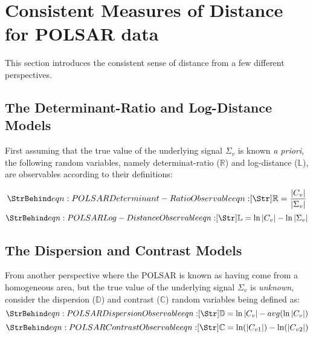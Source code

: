 \section{Consistent Measures of Distance for POLSAR data}
\label{sec:consistent_measures_distance_polsar}

This section introduces the consistent sense of distance from a few different perspectives.

\subsection{The Determinant-Ratio and Log-Distance Models}

First assuming that the true value of the underlying signal $\Sigma_v$ is known \textit{a priori},
the following random variables,
  namely determinat-ratio ($\mathbb{R}$) and log-distance ($\mathbb{L}$),
  are observables according to their definitions:

\begin{equation}
 \label{eqn:determinant_ratio_observables}
 \caption{eqn:POLSAR Determinant-Ratio Observable}
 \mathbb{R} = \frac{|C_v|}{|\Sigma_v|}
\end{equation}
\begin{equation}
 \label{eqn:log_distance_observables}
 \caption{eqn:POLSAR Log-Distance Observable}
 \mathbb{L} = \ln|C_v| - \ln|\Sigma_v|  
\end{equation}

\subsection{The Dispersion and Contrast Models}

From another perspective where the POLSAR is known as having come from a homogeneous area, but the true value of the underlying signal $\Sigma_v$ is \textit{unknown}, consider the dispersion ($\mathbb{D}$) and contrast ($\mathbb{C}$) random variables being defined as:
\begin{equation}
 \label{eqn:dispersion_observable}
 \caption{eqn:POLSAR Dispersion Observable}
 \mathbb{D} = \ln{|C_v|} - avg(\ln{|C_v|})  
\end{equation}
\begin{equation}
  \label{eqn:contrast_observable}
  \caption{eqn:POLSAR Contrast Observable}
  \mathbb{C} = \ln(|C_{v1}|) - \ln(|C_{v2}|)
\end{equation}

